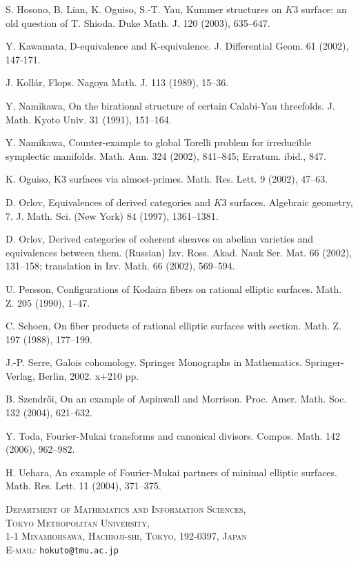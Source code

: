 \documentclass[a4paper,11pt]{article}
\theoremstyle{definition}\newtheorem{defn}[thm]{Definition}
\theoremstyle{remark}\newtheorem{remark}[thm]{Remark}
\numberwithin{equation}{section}
\begin{document}
\begin{thebibliography}{Fri95}
S. Hosono, B. Lian, K. Oguiso, S.-T. Yau, 
Kummer structures on $K3$ surface: an old question of T. Shioda. Duke Math. J. 120 (2003), 635--647. 

Y. Kawamata, D-equivalence and K-equivalence. J. Differential Geom. 61 (2002), 147-171.

J. Koll\'ar,
Flops. Nagoya Math. J. 113 (1989), 15--36. 

Y. Namikawa, 
On the birational structure of certain Calabi-Yau threefolds.
 J. Math. Kyoto Univ. 31 (1991), 151--164.


Y. Namikawa,
Counter-example to global Torelli problem for irreducible symplectic 
manifolds.  Math. Ann.  324  (2002), 841--845; 
Erratum. ibid., 847.

K. Oguiso, 
K3 surfaces via almost-primes. Math. Res. Lett. 9 (2002), 47--63.

D. Orlov, Equivalences of derived categories and $K3$ surfaces. 
Algebraic geometry, 7. J. Math. Sci. (New York) 84 (1997), 1361--1381.

D. Orlov, Derived categories of coherent sheaves on abelian varieties 
and equivalences between them. (Russian) Izv. Ross. Akad. Nauk Ser. Mat. 66 (2002), 131--158; translation in Izv. Math. 66 (2002), 569--594. 
 
U. Persson, Configurations of Kodaira fibers on rational elliptic surfaces. Math. Z. 205 (1990), 1--47.

C. Schoen, 
On fiber products of rational elliptic surfaces with section.
Math. Z. 197 (1988), 177--199. 

J.-P. Serre, Galois cohomology. Springer Monographs in Mathematics.
 Springer-Verlag, Berlin, 2002. x+210 pp. 

B. Szendr\H{o}i,
On an example of Aspinwall and Morrison.  Proc. Amer. Math. Soc.  132
(2004), 621--632.

Y. Toda, 
Fourier-Mukai transforms and canonical divisors. Compos. Math. 142 (2006),
962--982.
 
H. Uehara, An example of Fourier-Mukai partners of minimal elliptic surfaces. Math. Res. Lett. 11 (2004), 371--375.



\end{thebibliography}

\medskip
\noindent 
\textsc{Department of Mathematics
and Information Sciences,\\
Tokyo Metropolitan University,\\
1-1 Minamiohsawa,
Hachioji-shi,
Tokyo,
192-0397,
Japan \\
E-mail:}
\texttt{hokuto@tmu.ac.jp}
\end{document}
